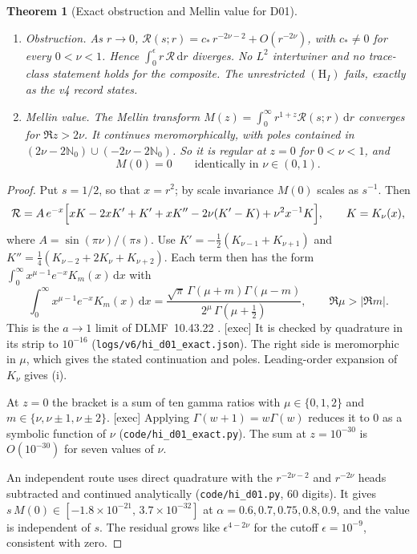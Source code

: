 \documentclass[11pt,a4paper]{article}
\newcommand{\NN}{\mathbb N}
\newcommand{\dd}{\mathrm d}
\newcommand{\HI}{(\mathrm H_I)}
\newcommand{\abs}[1]{\lvert #1\rvert}
\newcommand{\loc}[1]{\nolinkurl{#1}}
\theoremstyle{plain}
\newtheorem{theorem}{Theorem}[section]
\theoremstyle{definition}
\theoremstyle{remark}
\numberwithin{equation}{section}
\begin{document}
\begin{theorem}[Exact obstruction and Mellin value for D01]
\label{thm:HI}
\leavevmode
\begin{enumerate}[label=\textup{(\roman*)}]
\item \emph{Obstruction.}
As \(r\to0\), \(\mathcal R(s;r)=c_*\,r^{-2\nu-2}+O(r^{-2\nu})\),
with \(c_*\neq0\) for every \(0<\nu<1\).
Hence \(\int_0^\epsilon r\,\mathcal R\,\dd r\) diverges.
No \(L^2\) intertwiner and no trace-class statement holds for the
composite. The unrestricted \(\HI\) fails, exactly as the v4 record
states.

\item \emph{Mellin value.}
The Mellin transform
\(M(z)=\int_0^\infty r^{1+z}\mathcal R(s;r)\,\dd r\)
converges for \(\Re z>2\nu\).
It continues meromorphically, with poles contained in
\((2\nu-2\NN_0)\cup(-2\nu-2\NN_0)\).
So it is regular at \(z=0\) for \(0<\nu<1\), and
\[
M(0)=0\qquad\text{identically in }\nu\in(0,1).
\]
\end{enumerate}
\end{theorem}

\begin{proof}
Put \(s=1/2\), so that \(x=r^2\); by scale invariance
\(M(0)\) scales as \(s^{-1}\).
Then
\[
\mathcal R=A\,e^{-x}\Bigl[xK-2xK'+K'+xK''
-2\nu(K'-K)+\nu^2x^{-1}K\Bigr],
\qquad K=K_\nu(x),
\]
where \(A=\sin(\pi\nu)/(\pi s)\).
Use \(K'=-\tfrac12(K_{\nu-1}+K_{\nu+1})\) and
\(K''=\tfrac14(K_{\nu-2}+2K_\nu+K_{\nu+2})\).
Each term then has the form
\(\int_0^\infty x^{\mu-1}e^{-x}K_m(x)\,\dd x\) with
\[
\int_0^\infty x^{\mu-1}e^{-x}K_m(x)\,\dd x
=\frac{\sqrt\pi\,\Gamma(\mu+m)\Gamma(\mu-m)}
{2^\mu\,\Gamma(\mu+\tfrac12)},
\qquad \Re\mu>\abs{\Re m}.
\]
This is the \(a\to1\) limit of DLMF~10.43.22 \cite{DLMF}.
\textsf{[exec]} It is checked by quadrature in its strip to
\(10^{-16}\) (\loc{logs/v6/hi_d01_exact.json}).
The right side is meromorphic in \(\mu\), which gives the stated
continuation and poles.
Leading-order expansion of \(K_\nu\) gives (i).

At \(z=0\) the bracket is a sum of ten gamma ratios with
\(\mu\in\{0,1,2\}\) and \(m\in\{\nu,\nu\pm1,\nu\pm2\}\).
\textsf{[exec]} Applying \(\Gamma(w+1)=w\Gamma(w)\) reduces it
to \(0\) as a symbolic function of \(\nu\)
(\loc{code/hi_d01_exact.py}).
The sum at \(z=10^{-30}\) is \(O(10^{-30})\) for seven values of
\(\nu\).

An independent route uses direct quadrature with the
\(r^{-2\nu-2}\) and \(r^{-2\nu}\) heads subtracted and continued
analytically (\loc{code/hi_d01.py}, 60 digits).
It gives \(s\,M(0)\in[-1.8\times10^{-21},\,3.7\times10^{-32}]\)
at \(\alpha=0.6,0.7,0.75,0.8,0.9\), and the value is independent
of \(s\).
The residual grows like \(\epsilon^{4-2\nu}\) for the cutoff
\(\epsilon=10^{-9}\), consistent with zero.
\end{proof}
\end{document}
